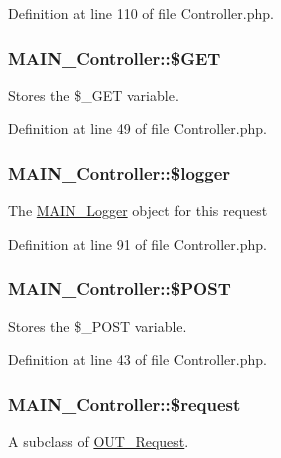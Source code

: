 Definition at line 110 of file Controller.php.\hypertarget{classMAIN__Controller_aa072e0fbed2a55683b79b6051898b405}{
\subsubsection[{\$GET}]{\setlength{\rightskip}{0pt plus 5cm}MAIN\_\-Controller::\$GET}}
\label{d0/d6f/classMAIN__Controller_aa072e0fbed2a55683b79b6051898b405}
Stores the \$\_\-GET variable. 

Definition at line 49 of file Controller.php.\hypertarget{classMAIN__Controller_a7fa8fc6630663c9024016edbba1f9fa5}{
\subsubsection[{\$logger}]{\setlength{\rightskip}{0pt plus 5cm}MAIN\_\-Controller::\$logger}}
\label{d0/d6f/classMAIN__Controller_a7fa8fc6630663c9024016edbba1f9fa5}
The \hyperlink{classMAIN__Logger}{MAIN\_\-Logger} object for this request 

Definition at line 91 of file Controller.php.\hypertarget{classMAIN__Controller_a340814c812daea328ea667392bf3dbac}{
\subsubsection[{\$POST}]{\setlength{\rightskip}{0pt plus 5cm}MAIN\_\-Controller::\$POST}}
\label{d0/d6f/classMAIN__Controller_a340814c812daea328ea667392bf3dbac}
Stores the \$\_\-POST variable. 

Definition at line 43 of file Controller.php.\hypertarget{classMAIN__Controller_aeb53199b16ee35291df91c7cc97148a7}{
\subsubsection[{\$request}]{\setlength{\rightskip}{0pt plus 5cm}MAIN\_\-Controller::\$request}}
\label{d0/d6f/classMAIN__Controller_aeb53199b16ee35291df91c7cc97148a7}
A subclass of \hyperlink{classOUT__Request}{OUT\_\-Request}. 

